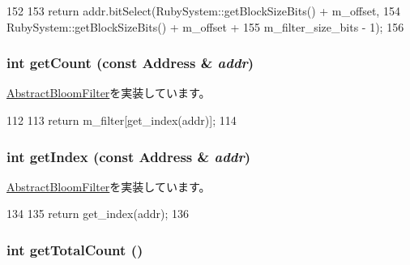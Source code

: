 \begin{DoxyCode}
152 {
153     return addr.bitSelect(RubySystem::getBlockSizeBits() + m_offset,
154                           RubySystem::getBlockSizeBits() + m_offset +
155                           m_filter_size_bits - 1);
156 }
\end{DoxyCode}
\hypertarget{classNonCountingBloomFilter_abb722634d5846105b673e9496df8d062}{
\subsubsection[{getCount}]{\setlength{\rightskip}{0pt plus 5cm}int getCount (const {\bf Address} \& {\em addr})}}
\label{classNonCountingBloomFilter_abb722634d5846105b673e9496df8d062}


\hyperlink{classAbstractBloomFilter_ab6253919ea6ff1b2c17506742b34147d}{AbstractBloomFilter}を実装しています。


\begin{DoxyCode}
112 {
113     return m_filter[get_index(addr)];
114 }
\end{DoxyCode}
\hypertarget{classNonCountingBloomFilter_a19f42f6f2fc3501021b768f0df8108b2}{
\subsubsection[{getIndex}]{\setlength{\rightskip}{0pt plus 5cm}int getIndex (const {\bf Address} \& {\em addr})}}
\label{classNonCountingBloomFilter_a19f42f6f2fc3501021b768f0df8108b2}


\hyperlink{classAbstractBloomFilter_a4dd174ae24a8237d41cf0b02c78b896d}{AbstractBloomFilter}を実装しています。


\begin{DoxyCode}
134 {
135     return get_index(addr);
136 }
\end{DoxyCode}
\hypertarget{classNonCountingBloomFilter_a97f66183ea41a7c123bab9dd5313a74a}{
\subsubsection[{getTotalCount}]{\setlength{\rightskip}{0pt plus 5cm}int getTotalCount ()}}
\label{classNonCountingBloomFilter_a97f66183ea41a7c123bab9dd5313a74a}


